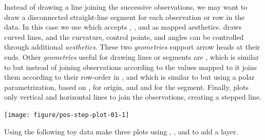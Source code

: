 \documentclass[krantz2]{krantz}\usepackage{knitr}%
\begin{document}
Instead of drawing a line joining the successive observations, we may want to draw a disconnected straight-line segment for each observation or row in the data. In this case we use  which accepts , ,  and  as mapped aesthetics.  draws curved lines, and the curvature, control points, and angles can be controlled through additional \emph{aesthetics}. These two \emph{geometries} support arrow heads at their ends. Other \emph{geometries} useful for drawing lines or segments are , which is similar to  but instead of joining observations according to the values mapped to  it joins them according to their row-order in , and  which is similar to  but using a polar parametrization, based on ,  for origin, and  and  for the segment. Finally,  plots only vertical and horizontal lines to join the observations, creating a stepped line.

\begin{knitrout}\footnotesize
{}\color{fgcolor}\begin{kframe}
\begin{alltt}
\hlstd{(} 
       \hlstd{(}      \hlopt{+}
  \hlstd{()}
\end{alltt}
\end{kframe}

{\centering \texttt{[image: figure/pos-step-plot-01-1]} 

}



\end{knitrout}

\begin{playground}
Using the following toy data make three plots using , , and  to add a layer.

\begin{knitrout}\footnotesize
{}\color{fgcolor}\begin{kframe}
\begin{alltt}
 \hlkwb{<-} \hlstd{(} \hlstd{=} \hlstd{(}\hlstd{,}\hlstd{,}\hlstd{,}\hlstd{),}  \hlstd{=} \hlstd{(}\hlstd{,}\hlstd{,}\hlstd{,}\hlstd{))}
\end{alltt}
\end{kframe}
\end{knitrout}
\end{playground}
\end{document}
